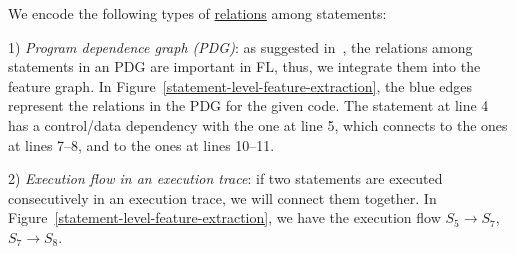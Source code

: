 

We encode the following types of \underline{relations} among
statements:

1) {\em Program dependence graph (PDG)}: as suggested
in~\cite{icse21-fl}, the relations among statements in an PDG are
important in FL, thus, we integrate them into the feature graph. In
Figure~\ref{statement-level-feature-extraction}, the blue edges
represent the relations in the PDG for the given code.  The statement
at line 4 has a control/data dependency with the one at line 5, which
connects to the ones at lines 7--8, and to the ones at lines 10--11.

2) {\em Execution flow in an execution trace}: if two
statements are executed consecutively in an execution trace, we will
connect them together. In
Figure~\ref{statement-level-feature-extraction}, we have the execution
flow $S_5 \rightarrow S_7$, $S_7 \rightarrow S_8$.


